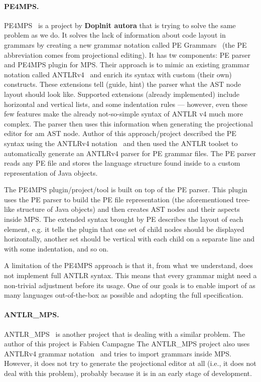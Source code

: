 \documentclass[10pt]{sigplanconf}
\newcommand{\todo}[1]{{\bfseries #1}}
\begin{document}
\paragraph{PE4MPS.}
PE4MPS~\cite{ref:PE4MPS} is a project by \todo{Doplnit autora} that is trying to solve the same problem as we do.
It solves the lack of information about code layout in grammars by creating a new grammar notation called PE Grammars~\cite{ref:PE} (the PE abbreviation comes from projectional editing).
It has tw components: PE parser and PE4MPS plugin for MPS.
Their approach is to mimic an existing grammar notation called ANTLRv4~\cite{ANTLR4} and enrich its syntax with custom (their own) constructs.
These extensions tell (guide, hint) the parser what the AST node layout should look like.
Supported extensions (already implemented) include horizontal and vertical lists, and some indentation rules --- however, even these few features make the already not-so-simple syntax of ANTLR v4 much more complex.
The parser then uses this information when generating the projectional editor for am AST node.
Author of this approach/project described the PE syntax using the ANTLRv4 notation~\cite{ANTLR4reference} and then used the ANTLR toolset to automatically generate an ANTLRv4 parser for PE grammar files.
The PE parser reads any PE file and stores the language structure found inside to a custom representation of Java objects.

The PE4MPS plugin/project/tool is built on top of the PE parser.
This plugin uses the PE parser to build the PE file representation (the aforementioned tree-like structure of Java objects) and then creates AST nodes and their aspects inside MPS.
The extended syntax brought by PE describes the layout of each element, e.g. it tells the plugin that one set of child nodes should be displayed horizontally, another set should be vertical with each child on a separate line and with some indentation, and so on.

A limitation of the PE4MPS approach is that it, from what we understand, does not implement full ANTLR syntax.
This means that every grammar might need a non-trivial adjustment before its usage.
One of our goals is to enable import of as many languages out-of-the-box as possible and adopting the full specification.

\paragraph{ANTLR{\_}MPS.}
ANTLR{\_}MPS~\cite{ANTLR2MPS} is another project that is dealing with a similar problem.
The author of this project is Fabien Campagne
The ANTLR{\_}MPS project also uses ANTLRv4 grammar notation~\cite{ANTLR4} and tries to import grammars inside MPS.
However, it does not try to generate the projectional editor at all (i.e., it does not deal with this problem), probably because it is in an early stage of development.
\end{document}

